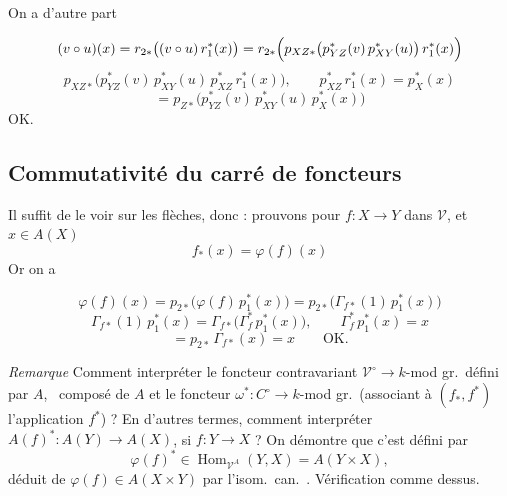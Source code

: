 \documentclass[11pt,a4paper]{article}
\begin{document}
On a d'autre part


\[
(v \circ u)(x) = r_{2*}\bigl( (v \circ u)\, r_{1}^{*}(x) \bigr)
= r_{2*}\Bigl( p_{XZ*}\bigl( p_{YZ}^{*}(v)\, p_{XY}^{*}(u) \bigr)\, r_{1}^{*}(x) \Bigr)
\]
\[
p_{XZ*}\bigl( p_{YZ}^{*}(v)\, p_{XY}^{*}(u)\, p_{XZ}^{*}\, r_{1}^{*}(x) \bigr),
\qquad p_{XZ}^{*}\, r_{1}^{*}(x) = p_{X}^{*}(x)
\]
\[
= p_{Z*}\bigl( p_{YZ}^{*}(v)\, p_{XY}^{*}(u)\, p_{X}^{*}(x) \bigr)
\]
OK.


\subsection*{Commutativité du carré de foncteurs}

Il suffit de le voir sur les flèches, donc : prouvons pour
$f \colon X \to Y$ dans $\mathcal{V}$, et $x \in A(X)$
\[ f_{*}(x) = \varphi(f)(x) \]
Or on a


\[
\varphi(f)(x) = p_{2*}\bigl( \varphi(f)\, p_{1}^{*}(x) \bigr) = p_{2*}\bigl( \Gamma_{f*}(1)\, p_{1}^{*}(x) \bigr)
\]
\[
\Gamma_{f*}(1)\, p_{1}^{*}(x) = \Gamma_{f*}\bigl( \Gamma_{f}^{*}\, p_{1}^{*}(x) \bigr),
\qquad \Gamma_{f}^{*}\, p_{1}^{*}(x) = x
\]
\[
= p_{2*}\, \Gamma_{f*}(x) = x \qquad \text{OK.}
\]


\emph{Remarque}  Comment interpréter le foncteur
contravariant $\mathcal{V}^{\circ} \to k$-mod gr.\ défini par $A$,
\ composé de $A$ et le foncteur
$\omega^{*} \colon C^{\circ} \to k$-mod gr.\ (associant à $(f_{*}, f^{*})$
l'application $f^{*}$) ? En d'autres termes, comment interpréter
$A(f)^{*} \colon A(Y) \to A(X)$, si $f \colon Y \to X$ ? On démontre que c'est
défini par
\[
\varphi(f)^{*} \in \operatorname{Hom}_{\mathcal{V}^{A}}(Y,X) = A(Y \times X),
\]
déduit de $\varphi(f) \in A(X \times Y)$ par l'isom.\ can.\
. Vérification comme dessus.
\end{document}
